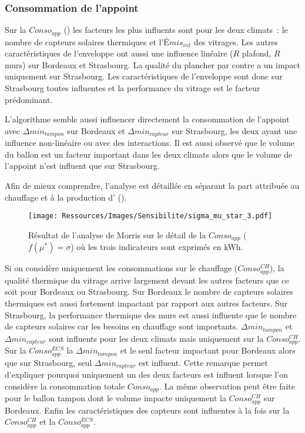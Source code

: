 \subsubsection{Consommation de l’appoint} %
\label{ssub:consommation_de_l_appoint}
Sur la $Conso_{app}$ () les facteurs les plus influents sont
pour les deux climats~: le nombre de capteurs solaires thermiques et l’$Émis_{int}$ des
vitrages. Les autres caractéristiques de l’enveloppe ont aussi une influence linéaire
($R$ plafond, $R$ murs) sur Bordeaux et Strasbourg. La qualité du plancher par contre a un
impact uniquement sur Strasbourg. Les caractéristiques de l’enveloppe sont donc sur
Strasbourg toutes influentes et la performance du vitrage est le facteur prédominant.

L’algorithme semble aussi influencer directement la consommation de l’appoint avec
$\Delta min_{tampon}$ sur Bordeaux et $\Delta min_{capteur}$ sur Strasbourg, les deux
ayant une influence non-linéaire ou avec des interactions. Il est aussi observé que
le volume du ballon  est un facteur important dans les deux climats alors
que le volume de l’appoint n’est influent que sur Strasbourg.

Afin de mieux comprendre, l’analyse est détaillée en séparant la part attribuée au
chauffage et à la production d’ ().

\begin{figure}
    \centering
    \texttt{[image: Ressources/Images/Sensibilite/sigma\_mu\_star\_3.pdf]}
    \caption[Résultat de l’analyse de Morris sur le détail de la
             $Conso_{app}$ ($f(\mu^{*}) = \sigma$)]
            {Résultat de l’analyse de Morris sur le détail de la
             $Conso_{app}$ ($f(\mu^{*}) = \sigma$) où les trois indicateurs sont exprimés
             en \si{kWh}.}
    \label{fig:conso_app_mu_star}
\end{figure}

Si on considère uniquement les consommations sur le chauffage ($Conso_{app}^{CH}$), la qualité
thermique du vitrage arrive largement devant les autres facteurs que ce soit pour Bordeaux
ou Strasbourg. Sur Bordeaux le nombre de capteurs solaires thermiques est aussi fortement
impactant par rapport aux autres facteurs. Sur Strasbourg, la performance thermique des
murs est aussi influente que le nombre de capteurs solaires car les besoins en chauffage
sont importants.
$\Delta min_{tampon}$ et $\Delta min_{capteur}$ sont influents pour les deux climats mais
uniquement sur la $Conso_{app}^{CH}$. Sur la $Conso_{app}^{ECS}$ la $\Delta min_{tampon}$
et le seul facteur impactant pour Bordeaux alors que sur Strasbourg, seul $\Delta
min_{capteur}$ est influent. Cette remarque permet d’expliquer pourquoi uniquement un des
deux facteurs est influent lorsque l’on considère la consommation totale $Conso_{app}$. La
même observation peut être faite pour le ballon tampon dont le volume impacte uniquement
la $Conso_{app}^{CH}$ sur Bordeaux. Enfin les caractéristiques des capteurs sont
influentes à la fois sur la $Conso_{app}^{CH}$ et la $Conso_{app}^{ECS}$.

